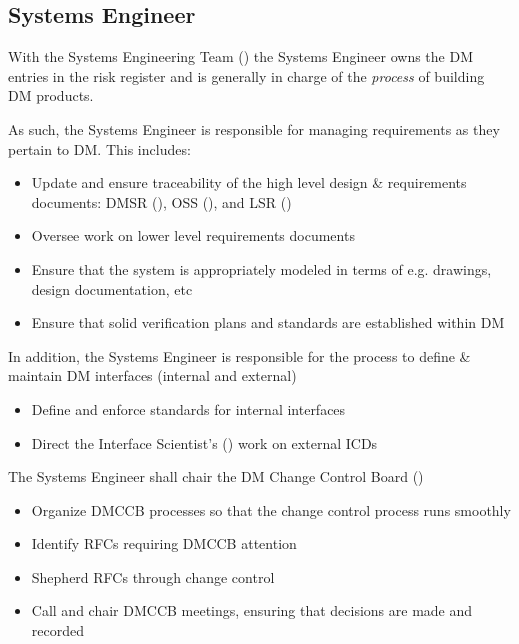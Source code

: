 \subsection{Systems Engineer \label{role:sysengineer}}

With the \gls{Systems Engineering} Team () the \gls{Systems Engineer} owns the \gls{DM} entries in the risk register and is generally in charge of the \textit{process} of building \gls{DM} products.

As such, the \gls{Systems Engineer} is responsible for managing requirements as they pertain to \gls{DM}.
This includes:

\begin{itemize}
\item Update and ensure traceability of the high level design \& requirements documents: \gls{DMSR} (), \gls{OSS} (), and \gls{LSR} ()
\item Oversee work on lower level requirements documents
\item Ensure  that the system is appropriately modeled in terms of e.g. drawings, design documentation, etc
\item Ensure  that solid verification plans and standards are established within \gls{DM}
\end{itemize}

In addition, the \gls{Systems Engineer} is responsible for the process to define \& maintain \gls{DM} interfaces (internal and external)

\begin{itemize}
\item Define and enforce standards for internal interfaces
\item Direct the Interface Scientist's () work on external ICDs
\end{itemize}

The \gls{Systems Engineer} shall chair the \gls{DM} \gls{Change Control Board} ()

\begin{itemize}
\item Organize \gls{DMCCB} processes so that the change control process runs smoothly
\item Identify RFCs requiring \gls{DMCCB} attention
\item Shepherd RFCs through change control
\item Call and chair \gls{DMCCB} meetings, ensuring that decisions are made and recorded
\end{itemize}

